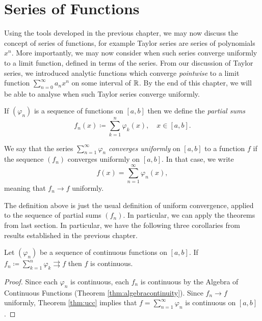 \documentclass[../analysis1.tex]{subfiles}
\begin{document}
\chapter{Series of Functions}

Using the tools developed in the previous chapter, we may now discuss the concept of series of functions, for example Taylor series are series of polynomials $x^n$. More importantly, we may now consider when such series converge uniformly to a limit function, defined in terms of the series. From our discussion of Taylor series, we introduced analytic functions which converge \textit{pointwise} to a limit function $\sum_{n=0}^{\infty}a_nx^n$ on some interval of $\mathbb{R}$. By the end of this chapter, we will be able to analyse when such Taylor series converge uniformly.

If $(\varphi_n)$ is a sequence of functions on $[a,b]$ then we define the \textit{partial sums} \[f_n(x)\coloneqq \sum_{k=1}^n \varphi_k(x),\quad x\in[a,b].\]
\begin{definition}
    \begin{shaded*}
        We say that the series $\sum_{n=1}^{\infty}\varphi_n$ \textit{converges uniformly} on $[a,b]$ to a function $f$ if the sequence $(f_n)$ converges uniformly on $[a,b]$. In that case, we write
        \[f(x)=\sum_{n=1}^{\infty}\varphi_n(x),\]
        meaning that $f_n\to f$ uniformly.
    \end{shaded*}
\end{definition}

The definition above is just the usual definition of uniform convergence, applied to the sequence of partial sums $(f_n)$. In particular, we can apply the theorems from last section. In particular, we have the following three corollaries from results established in the previous chapter.

\begin{corollary}
    \begin{shaded*}
        Let $(\varphi_n)$ be a sequence of continuous functions on $[a,b]$. If $f_n\coloneqq \sum_{k=1}^n \varphi_k \rightrightarrows f$ then $f$ is continuous.
    \end{shaded*}
\end{corollary}
\begin{proof}
    Since each $\varphi_n$ is continuous, each $f_n$ is continuous by the Algebra of Continuous Functions (Theorem \ref{thm:algebracontinuity}). Since $f_n\to f$ uniformly, Theorem \ref{thm:ucc} implies that $f=\sum_{n=1}^{\infty}\varphi_n$ is continuous on $[a,b]$.\qedhere
\end{proof}
\end{document}
